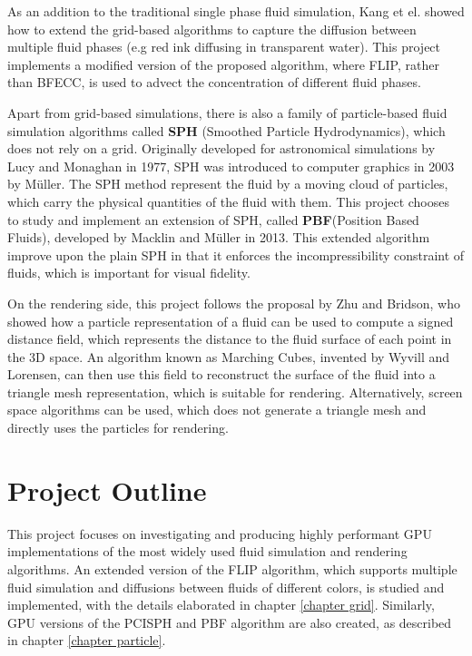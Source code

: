 As an addition to the traditional single phase fluid simulation, Kang et el.\cite{kang2010hybrid} showed how to extend the grid-based algorithms to capture the diffusion between multiple fluid phases (e.g red ink diffusing in transparent water). This project implements a modified version of the proposed algorithm, where FLIP, rather than BFECC, is used to advect the concentration of different fluid phases.



Apart from grid-based simulations, there is also a family of particle-based fluid simulation algorithms called \textbf{SPH} (Smoothed Particle Hydrodynamics), which does not rely on a grid. Originally developed for astronomical simulations by Lucy\cite{lucy1977numerical} and Monaghan \cite{monaghan1992smoothed} in 1977, SPH was introduced to computer graphics in 2003 by Müller\cite{muller2003particle}. The SPH method represent the fluid by a moving cloud of particles, which carry the physical quantities of the fluid with them. This project chooses to study and implement an extension of SPH, called \textbf{PBF}(Position Based Fluids), developed by Macklin and Müller\cite{macklin2013position} in 2013. This extended algorithm improve upon the plain SPH in that it enforces the incompressibility constraint of fluids, which is important for visual fidelity. 


On the rendering side, this project follows the proposal by Zhu and Bridson\cite{zhu2005animating}, who showed how a particle representation of a fluid can be used to compute a signed distance field, which represents the distance to the fluid surface of each point in the 3D space. An algorithm known as Marching Cubes, invented by Wyvill\cite{wyvill1986soft} and Lorensen\cite{lorensen1987marching}, can then use this field to reconstruct the surface of the fluid into a triangle mesh representation, which is suitable for rendering. Alternatively, screen space algorithms\cite{van2009screen} can be used, which does not generate a triangle mesh and directly uses the particles for rendering.



\section{Project Outline}


This project focuses on investigating and producing highly performant GPU implementations of the most widely used fluid simulation and rendering algorithms. An extended version of the FLIP algorithm, which supports multiple fluid simulation and diffusions between fluids of different colors, is studied and implemented, with the details elaborated in chapter \ref{chapter grid}. Similarly, GPU versions of the PCISPH and PBF algorithm are also created, as described in chapter \ref{chapter particle}. 

